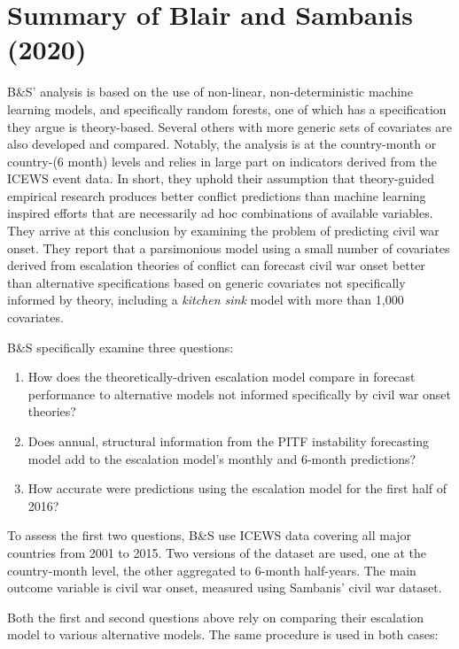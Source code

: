 \documentclass[
]{article}
\providecommand{\tightlist}{%
  \setlength{\itemsep}{0pt}\setlength{\parskip}{0pt}}
\begin{document}
\hypertarget{summary-of-blair-and-sambanis-2020}{%
\section{Summary of Blair and Sambanis (2020)}\label{summary-of-blair-and-sambanis-2020}}

B\&S' analysis is based on the use of non-linear, non-deterministic machine learning models, and specifically random forests, one of which has a specification they argue is theory-based. Several others with more generic sets of covariates are also developed and compared. Notably, the analysis is at the country-month or country-(6 month) levels and relies in large part on indicators derived from the ICEWS event data. In short, they uphold their assumption that theory-guided empirical research produces better conflict predictions than machine learning inspired efforts that are necessarily ad hoc combinations of available variables. They arrive at this conclusion by examining the problem of predicting civil war onset. They report that a parsimonious model using a small number of covariates derived from escalation theories of conflict can forecast civil war onset better than alternative specifications based on generic covariates not specifically informed by theory, including a \textit{kitchen sink} model with more than 1,000 covariates.

B\&S specifically examine three questions:

\begin{enumerate}
\def\labelenumi{\arabic{enumi}.}
\tightlist
\item
  How does the theoretically-driven escalation model compare in forecast performance to alternative models not informed specifically by civil war onset theories?
\item
  Does annual, structural information from the PITF instability forecasting model add to the escalation model's monthly and 6-month predictions?
\item
  How accurate were predictions using the escalation model for the first half of 2016?
\end{enumerate}

To assess the first two questions, B\&S use ICEWS data covering all major countries from 2001 to 2015. Two versions of the dataset are used, one at the country-month level, the other aggregated to 6-month half-years. The main outcome variable is civil war onset, measured using Sambanis' civil war dataset.

Both the first and second questions above rely on comparing their escalation model to various alternative models. The same procedure is used in both cases:
\end{document}
